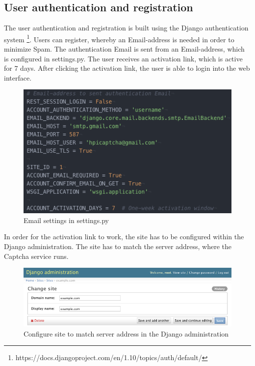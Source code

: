 \subsection{User authentication and registration}

The user authentication and registration is built using the Django authentication system \footnote{https://docs.djangoproject.com/en/1.10/topics/auth/default/}. Users can register, whereby an Email-address is needed in order to minimize Spam. The authentication Email is sent from an Email-address, which is configured in settings.py.
The user receives an activation link, which is active for 7 days. After clicking the activation link, the user is able to login into the web interface.
\begin{figure}[H]
\centering
\includegraphics[width=0.8\linewidth]{content/figures/email_settings.png}
\caption{Email settings in settings.py}
\label{fig:email_settings}
\end{figure}

In order for the activation link to work, the site has to be configured within the Django administration. The site has to match the server address, where the Captcha service runs.
\begin{figure}[H]
\centering
\includegraphics[width=1\linewidth]{content/figures/site_administration.png}
\caption{Configure site to match server address in the Django administration}
\label{fig:site_administration}
\end{figure}

\clearpage

